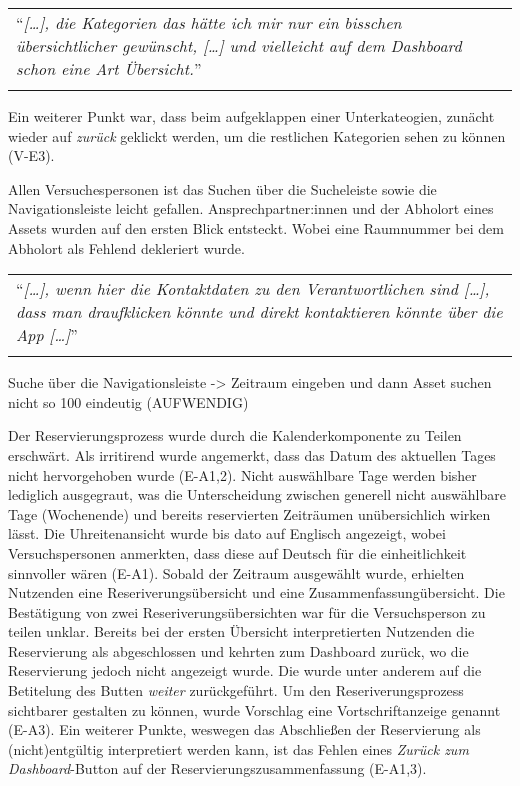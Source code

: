 \begin{longtable}{p{}} \arrayrulecolor{maincolor}\hline
  \enquote{\textit{[\dots], die Kategorien das hätte ich mir nur ein bisschen
  übersichtlicher gewünscht, [\dots] und vielleicht auf dem Dashboard schon eine
  Art Übersicht.}} \\
  \arrayrulecolor{maincolor}\hline
\end{longtable}

Ein weiterer Punkt war, dass beim aufgeklappen einer Unterkateogien, zunächt
wieder auf \textit{zurück} geklickt werden, um die restlichen Kategorien sehen
zu können (V-E3). 

Allen Versuchespersonen ist das Suchen über die Sucheleiste sowie die
Navigationsleiste leicht gefallen. Ansprechpartner:innen und der Abholort eines
Assets wurden auf den ersten Blick entsteckt. Wobei eine Raumnummer bei dem
Abholort als Fehlend dekleriert wurde. 

\begin{longtable}{p{}} \arrayrulecolor{maincolor}\hline
  \enquote{\textit{[\dots], wenn hier die Kontaktdaten zu den Verantwortlichen
    sind [\dots], dass man draufklicken könnte und direkt kontaktieren könnte
    über die App [\dots]}} \\
  \arrayrulecolor{maincolor}\hline
\end{longtable}

Suche über die Navigationsleiste -> Zeitraum eingeben und dann Asset suchen
nicht so 100 eindeutig (AUFWENDIG)

Der Reservierungsprozess wurde durch die Kalenderkomponente zu Teilen erschwärt.
Als irritirend wurde angemerkt, dass das Datum des aktuellen Tages nicht
hervorgehoben wurde (E-A1,2). Nicht auswählbare Tage werden bisher lediglich
ausgegraut, was die Unterscheidung zwischen generell nicht auswählbare Tage
(Wochenende) und bereits reservierten Zeiträumen unübersichlich wirken lässt.
Die Uhreitenansicht wurde bis dato auf Englisch angezeigt, wobei
Versuchspersonen anmerkten, dass diese auf Deutsch für die einheitlichkeit
sinnvoller wären (E-A1). Sobald der Zeitraum ausgewählt wurde, erhielten
Nutzenden eine Reseriverungsübersicht und eine Zusammenfassungübersicht. Die
Bestätigung von zwei Reseriverungsübersichten war für die Versuchsperson zu
teilen unklar. Bereits bei der ersten Übersicht interpretierten Nutzenden die
Reservierung als abgeschlossen und kehrten zum Dashboard zurück, wo die
Reservierung jedoch nicht angezeigt wurde. Die wurde unter anderem auf die
Betitelung des Butten \textit{weiter} zurückgeführt. Um den Reseriverungsprozess
sichtbarer gestalten zu können, wurde Vorschlag eine Vortschriftanzeige genannt
(E-A3). Ein weiterer Punkte, weswegen das Abschließen der Reservierung als
(nicht)entgültig interpretiert werden kann, ist das Fehlen eines \textit{Zurück
zum Dashboard}-Button auf der Reservierungszusammenfassung (E-A1,3).

